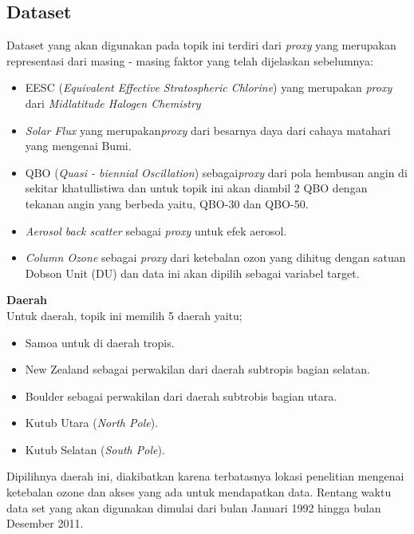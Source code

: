 \begin{enumerate}
\subsection{Dataset}
Dataset yang akan digunakan pada topik ini terdiri dari \textit{proxy} yang merupakan representasi dari masing - masing faktor yang telah dijelaskan sebelumnya:\\
\begin{itemize}
\item EESC (\textit{Equivalent Effective Stratospheric Chlorine}) yang merupakan \textit{proxy} dari \textit{Midlatitude Halogen Chemistry} 
\item \textit{Solar Flux} yang merupakan\textit{proxy} dari besarnya daya dari cahaya matahari yang mengenai Bumi.
\item QBO (\textit{Quasi - biennial Oscillation}) sebagai\textit{proxy} dari pola hembusan angin di sekitar khatullistiwa dan untuk topik ini akan diambil 2 QBO dengan tekanan angin yang berbeda yaitu, QBO-30 dan QBO-50.
\item \textit{Aerosol back scatter} sebagai \textit{proxy} untuk efek aerosol.
\item \textit{Column Ozone} sebagai \textit{proxy} dari ketebalan ozon yang dihitug dengan satuan Dobson Unit (DU) dan data ini akan dipilih sebagai variabel target.
\end{itemize}


\textbf{Daerah} \\
Untuk daerah, topik ini memilih 5 daerah yaitu;
\begin{itemize}
    \item Samoa untuk di daerah tropis.
    \item New Zealand sebagai perwakilan dari daerah subtropis bagian selatan.
    \item Boulder sebagai perwakilan dari daerah subtrobis bagian utara.
    \item Kutub Utara (\textit{North Pole}).
    \item Kutub Selatan (\textit{South Pole}).
\end{itemize}
Dipilihnya daerah ini, diakibatkan karena terbatasnya lokasi penelitian mengenai ketebalan ozone dan akses yang ada untuk mendapatkan data.
Rentang waktu data set yang akan digunakan dimulai dari bulan Januari 1992 hingga bulan Desember 2011.

\end{enumerate}
